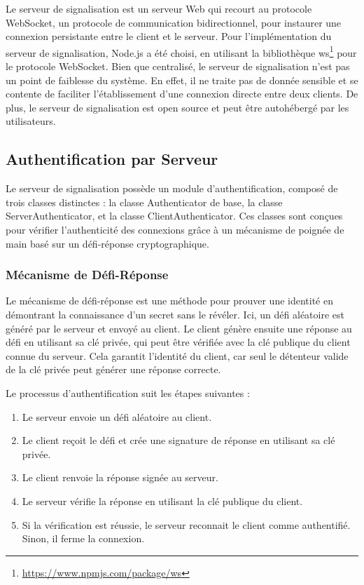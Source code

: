 Le serveur de signalisation est un serveur Web qui recourt au protocole \Gls{WebSocket}, un protocole de communication bidirectionnel, pour instaurer une connexion persistante entre le client et le serveur. Pour l'implémentation du serveur de signalisation, Node.js a été choisi, en utilisant la bibliothèque ws\footnote{\url{https://www.npmjs.com/package/ws}} pour le protocole \Gls{WebSocket}. Bien que centralisé, le serveur de signalisation n'est pas un point de faiblesse du système. En effet, il ne traite pas de donnée sensible et se contente de faciliter l'établissement d'une connexion directe entre deux clients. De plus, le serveur de signalisation est open source et peut être autohébergé par les utilisateurs.

\subsection{Authentification par Serveur}

Le serveur de signalisation possède un module d'authentification, composé de trois classes distinctes : la classe Authenticator de base, la classe ServerAuthenticator, et la classe ClientAuthenticator. Ces classes sont conçues pour vérifier l'authenticité des connexions grâce à un mécanisme de poignée de main basé sur un défi-réponse cryptographique.

\subsubsection{Mécanisme de Défi-Réponse}

Le mécanisme de défi-réponse est une méthode pour prouver une identité en démontrant la connaissance d'un secret sans le révéler. Ici, un défi aléatoire est généré par le serveur et envoyé au client. Le client génère ensuite une réponse au défi en utilisant sa clé privée, qui peut être vérifiée avec la clé publique du client connue du serveur. Cela garantit l'identité du client, car seul le détenteur valide de la clé privée peut générer une réponse correcte.

Le processus d'authentification suit les étapes suivantes :

\begin{enumerate}
  \item Le serveur envoie un défi aléatoire au client.
  \item Le client reçoit le défi et crée une signature de réponse en utilisant sa clé privée.
  \item Le client renvoie la réponse signée au serveur.
  \item Le serveur vérifie la réponse en utilisant la clé publique du client.
  \item Si la vérification est réussie, le serveur reconnait le client comme authentifié. Sinon, il ferme la connexion.
\end{enumerate}

